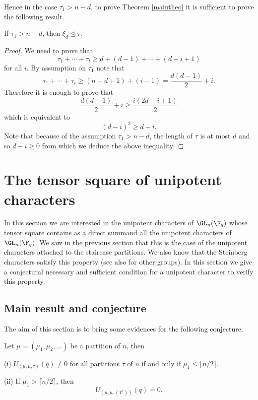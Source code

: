 Hence in the case $\tau_1>n-d$,  to prove Theorem \ref{maintheo}  it is sufficient to prove the following result.

\begin{lemm}If $\tau_1>n-d$, then $\xi_d\trianglelefteq \tau$.
\end{lemm}

\begin{proof}We need to prove that
	$$
	\tau_1+\cdots+\tau_i\geq d+(d-1)+\cdots+(d-i+1)
	$$
	for all $i$.
	By assumption on $\tau_1$ note that
	$$
	\tau_1+\cdots+\tau_i\geq (n-d+1)+(i-1)=\frac{d(d-1)}{2}+i.
	$$
	Therefore it is enough to prove that
	$$
	\frac{d(d-1)}{2}+i\geq \frac{i(2d-i+1)}{2}
	$$
	which is equivalent to 
	$$
	(d-i)^2\geq d-i.
	$$
	Note that because of the assumption $\tau_1>n-d$, the length of $\tau$ is at most $d$ and so $d-i\geq 0$ from which we deduce the above inequality.
\end{proof}

\section{The tensor square of unipotent characters}\label{tensor}

In this section we are interested  in the unipotent characters of $\GL_n(\F_q)$ whose tensor square contains as a direct summand all the unipotent characters of $\GL_n(\F_q)$. We saw in the previous section that this is the case of the unipotent characters attached to the staircase partitions. We also know that the Steinberg characters satisfy this property \cite[Proposition 33]{L1} (see also \cite{HSTZ} for other groups). In this section we give a conjectural necessary and sufficient condition for a unipotent character to verify this property.



\subsection{Main result and conjecture}


The aim of this section is to bring some evidences for the following conjecture.

\begin{conj} Let $\mu=(\mu_1,\mu_2,\dots)$ be a partition of $n$, then 
	
	(i) $U_{(\mu,\mu,\tau)}(q)\neq 0$ for all partitions $\tau$ of $n$  if and only if $\mu_1\leq \lceil n/2\rceil$.
	
	(ii) If  $\mu_1>\lceil n/2\rceil$, then 
	$$
	U_{(\mu,\mu,(1^n))}(q)= 0.
	$$
	\label{conj}\end{conj}


